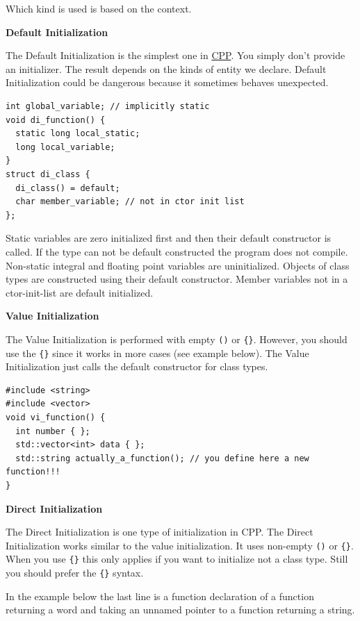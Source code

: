 \documentclass[11pt,twoside,landscape]{article}
\begin{document}
\begin{multicols}{3}
Which kind is used is based on the context.

\textbf{Default Initialization}

The Default Initialization is the simplest one in \href{../../../roam/20210920103243-c.org}{CPP}.
You simply don't provide an initializer.
The result depends on the kinds of entity we declare.
Default Initialization could be dangerous because it sometimes behaves unexpected.

\lstset{language=c++,label= ,caption= ,captionpos=b,numbers=none}
\begin{lstlisting}
int global_variable; // implicitly static
void di_function() {
  static long local_static;
  long local_variable;
}
struct di_class {
  di_class() = default;
  char member_variable; // not in ctor init list
};
\end{lstlisting}

Static variables are zero initialized first and then their default constructor is called.
If the type can not be default constructed the program does not compile.
Non-static integral and floating point variables are uninitialized.
Objects of class types are constructed using their default constructor.
Member variables not in a ctor-init-list are default initialized.

\textbf{Value Initialization}

The Value Initialization is performed with empty \texttt{()} or \texttt{\{\}}.
However, you should use the \texttt{\{\}} since it works in more cases (see example below).
The Value Initialization just calls the default constructor for class types.

\lstset{language=c++,label= ,caption= ,captionpos=b,numbers=none}
\begin{lstlisting}
#include <string>
#include <vector>
void vi_function() {
  int number { };
  std::vector<int> data { };
  std::string actually_a_function(); // you define here a new function!!!
}
\end{lstlisting}

\textbf{Direct Initialization}

The Direct Initialization is one type of initialization in CPP.
The Direct Initialization works similar to the value initialization.
It uses non-empty \texttt{()} or \texttt{\{\}}.
When you use \texttt{\{\}} this only applies if you want to initialize not a class type.
Still you should prefer the \texttt{\{\}} syntax.

In the example below the last line is a function declaration of a function returning a word and taking an unnamed pointer to a function returning a string.


\end{multicols}
\end{document}
